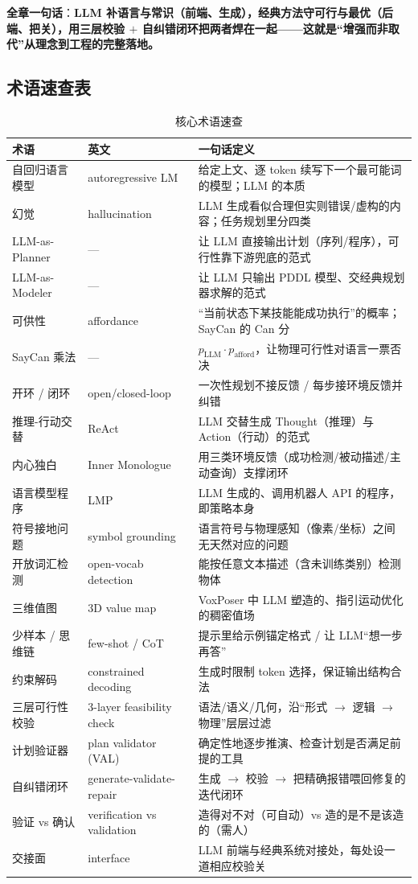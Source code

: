 \noindent \textbf{全章一句话}：\textbf{LLM 补语言与常识（前端、生成），经典方法守可行与最优（后端、把关），用三层校验 $+$ 自纠错闭环把两者焊在一起——这就是“增强而非取代”从理念到工程的完整落地。}

\subsection*{术语速查表}

\begin{table}[H]\centering\small
\caption{核心术语速查}
\label{tab:llm-glossary}
\begin{tabular}{p{3.0cm}p{3.6cm}p{6.0cm}}
\toprule
术语 & 英文 & 一句话定义 \\
\midrule
自回归语言模型 & autoregressive LM & 给定上文、逐 token 续写下一个最可能词的模型；LLM 的本质 \\
幻觉 & hallucination & LLM 生成看似合理但实则错误/虚构的内容；任务规划里分四类 \\
LLM-as-Planner & — & 让 LLM 直接输出计划（序列/程序），可行性靠下游兜底的范式 \\
LLM-as-Modeler & — & 让 LLM 只输出 PDDL 模型、交经典规划器求解的范式 \\
可供性 & affordance & “当前状态下某技能能成功执行”的概率；SayCan 的 Can 分 \\
SayCan 乘法 & — & $p_{\text{LLM}}\cdot p_{\text{afford}}$，让物理可行性对语言一票否决 \\
开环 / 闭环 & open/closed-loop & 一次性规划不接反馈 / 每步接环境反馈并纠错 \\
推理-行动交替 & ReAct & LLM 交替生成 Thought（推理）与 Action（行动）的范式 \\
内心独白 & Inner Monologue & 用三类环境反馈（成功检测/被动描述/主动查询）支撑闭环 \\
语言模型程序 & LMP & LLM 生成的、调用机器人 API 的程序，即策略本身 \\
符号接地问题 & symbol grounding & 语言符号与物理感知（像素/坐标）之间无天然对应的问题 \\
开放词汇检测 & open-vocab detection & 能按任意文本描述（含未训练类别）检测物体 \\
三维值图 & 3D value map & VoxPoser 中 LLM 塑造的、指引运动优化的稠密值场 \\
少样本 / 思维链 & few-shot / CoT & 提示里给示例锚定格式 / 让 LLM“想一步再答” \\
约束解码 & constrained decoding & 生成时限制 token 选择，保证输出结构合法 \\
三层可行性校验 & 3-layer feasibility check & 语法/语义/几何，沿“形式 $\to$ 逻辑 $\to$ 物理”层层过滤 \\
计划验证器 & plan validator (VAL) & 确定性地逐步推演、检查计划是否满足前提的工具 \\
自纠错闭环 & generate-validate-repair & 生成 $\to$ 校验 $\to$ 把精确报错喂回修复的迭代闭环 \\
验证 vs 确认 & verification vs validation & 造得对不对（可自动）vs 造的是不是该造的（需人） \\
交接面 & interface & LLM 前端与经典系统对接处，每处设一道相应校验关 \\
\bottomrule
\end{tabular}
\end{table}

